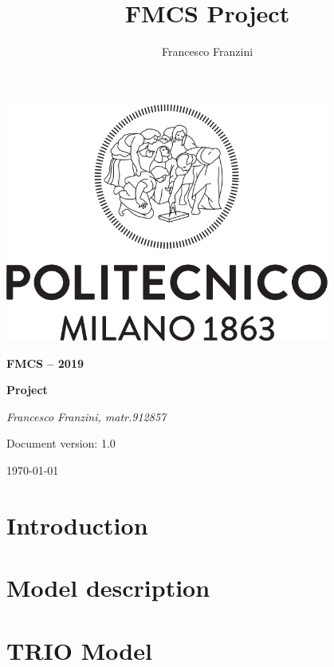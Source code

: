 \documentclass[a4paper]{article}
\author{Francesco Franzini}
\title{FMCS Project}
\begin{document}
	
\begin{titlepage}
	\centering
	\includegraphics[width=0.80\textwidth]{pictures/Logo_Politecnico_Milano}\par
	\vspace{1.5cm}
	{\LARGE \textbf {FMCS – 2019} \par}
	\vspace{0.3cm}
	{\large \textbf{Project} \par}
	\vspace{1.5cm}
	{\Large{} \par}
	\vspace{1.5cm}
	{\Large\itshape Francesco Franzini, matr.912857 \\}
	\vspace{2cm}
	\vfill
	{\large Document version: 1.0\par}
	{\large \today \par}
\end{titlepage}	
	

\maketitle
\tableofcontents
\clearpage

\section{Introduction}




\clearpage

\section{Model description}





\clearpage

\section{TRIO Model}


\clearpage

	
\end{document}
